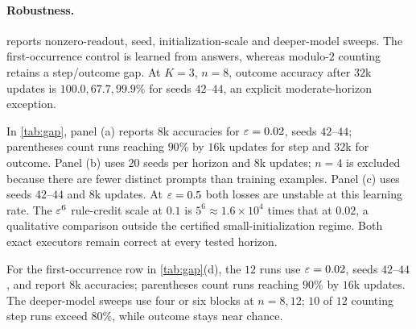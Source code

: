 \paragraph{Robustness.}  reports nonzero-readout, seed, initialization-scale and deeper-model sweeps.
The first-occurrence control is learned from answers, whereas modulo-$2$ counting retains a step/outcome gap.
At $K=3$, $n=8$, outcome accuracy after $32$k updates is $100.0,67.7,99.9\%$ for seeds $42$--$44$,
an explicit moderate-horizon exception.

In \cref{tab:gap}, panel (a) reports $8$k accuracies for $\varepsilon=0.02$, seeds $42$--$44$; parentheses count runs reaching
$90\%$ by $16$k updates for step and $32$k for outcome. Panel (b) uses $20$ seeds per horizon and $8$k updates;
$n=4$ is excluded because there are fewer distinct prompts than training examples. Panel (c) uses seeds $42$--$44$ and $8$k updates.
At $\varepsilon=0.5$ both losses are unstable at this learning rate. The $\varepsilon^6$ rule-credit scale at $0.1$ is
$5^6\approx1.6\times10^4$ times that at $0.02$, a qualitative comparison outside the certified small-initialization regime.
Both exact executors remain correct at every tested horizon.

For the first-occurrence row in \cref{tab:gap}(d), the $12$ runs use $\varepsilon=0.02$, seeds $42$--$44$, and report $8$k accuracies;
parentheses count runs reaching $90\%$ by $16$k updates. The deeper-model sweeps use four or six blocks at $n=8,12$;
$10$ of $12$ counting step runs exceed $80\%$, while outcome stays near chance.

